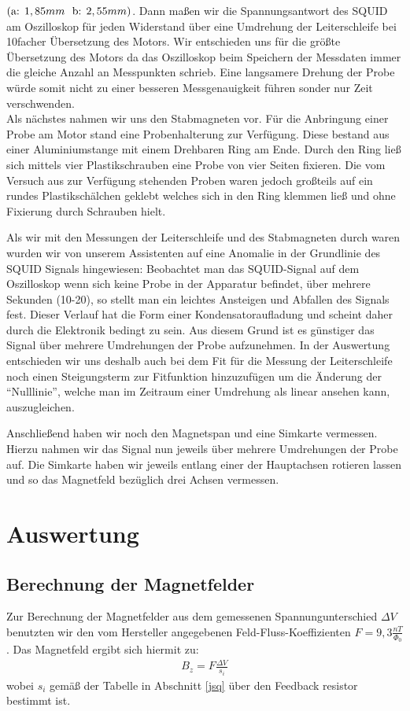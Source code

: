 \documentclass[12pt]{article}
\begin{document}
 $(\textnormal{a: }1,85mm~\textnormal{ b: }2,55mm)$. 
Dann maßen wir die Spannungsantwort des SQUID am Oszilloskop für jeden Widerstand über eine Umdrehung der 
Leiterschleife bei 10facher Übersetzung des Motors. Wir entschieden uns für die größte Übersetzung des Motors 
da das Oszilloskop beim Speichern der Messdaten immer die gleiche Anzahl an Messpunkten schrieb. 
Eine langsamere Drehung der Probe würde somit nicht zu einer besseren Messgenauigkeit führen sonder nur
 Zeit verschwenden.\\

Als nächstes nahmen wir uns den Stabmagneten vor. Für die Anbringung einer Probe am Motor stand eine Probenhalterung 
zur Verfügung. Diese bestand aus einer Aluminiumstange mit einem Drehbaren Ring am Ende. Durch den Ring ließ sich
 mittels vier Plastikschrauben eine Probe von vier Seiten fixieren. Die vom Versuch aus zur Verfügung stehenden
 Proben waren jedoch großteils auf ein rundes Plastikschälchen geklebt welches sich in den Ring klemmen ließ und 
ohne Fixierung durch Schrauben hielt.

Als wir mit den Messungen der Leiterschleife und des Stabmagneten durch waren wurden wir von unserem Assistenten auf eine Anomalie in der Grundlinie des SQUID Signals hingewiesen: Beobachtet man das SQUID-Signal auf dem Oszilloskop wenn sich keine Probe in der Apparatur befindet, über mehrere Sekunden (10-20), so stellt man ein leichtes Ansteigen und Abfallen des Signals fest. Dieser Verlauf hat die Form einer Kondensatoraufladung und scheint daher durch die Elektronik bedingt zu sein. Aus diesem Grund ist es günstiger das Signal über mehrere Umdrehungen der Probe aufzunehmen. In der Auswertung entschieden wir uns deshalb auch bei dem Fit für die Messung der Leiterschleife noch einen Steigungsterm zur Fitfunktion hinzuzufügen um die Änderung der "`Nulllinie"', welche man im Zeitraum einer Umdrehung als linear ansehen kann, auszugleichen.

Anschließend haben wir noch den Magnetspan und eine Simkarte vermessen. Hierzu nahmen wir das Signal nun jeweils über mehrere Umdrehungen der Probe auf.
Die Simkarte haben wir jeweils entlang einer der Hauptachsen rotieren lassen und so das Magnetfeld bezüglich drei Achsen vermessen.

\section{Auswertung}
\subsection{Berechnung der Magnetfelder}
Zur Berechnung der Magnetfelder aus dem gemessenen Spannungunterschied $\varDelta V$ benutzten wir den vom Hersteller angegebenen Feld-Fluss-Koeffizienten $F=9,3 \frac{nT}{\Phi_0}$. Das Magnetfeld ergibt sich hiermit zu:
\begin{align}
 B_z=F \frac{\varDelta V}{s_i}
\end{align}
wobei $s_i$ gemäß der Tabelle in Abschnitt \ref{jsq} über den Feedback resistor bestimmt ist.
\end{document}

